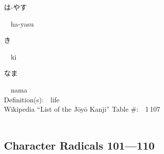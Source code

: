 \begin{multicols}{2}
{\hspace*{2em}}{\begin{CJK}{UTF8}{min} は-やす \end{CJK}}\ \ ha-yasu\ \ \\
{\hspace*{2em}}{\begin{CJK}{UTF8}{min} き \end{CJK}}\ \ ki\ \ \\
{\hspace*{2em}}{\begin{CJK}{UTF8}{min} なま \end{CJK}}\ \ nama\ \ \\
Definition(s):\ \ life \\
Wikipedia ``List of the J\=oy\=o Kanji'' Table \#:\ \ 1\,107 \\
\ \ \\
\end{multicols}



\newpage



\subsection*{Character Radicals 101---110 }
  \label{P3-S12}

